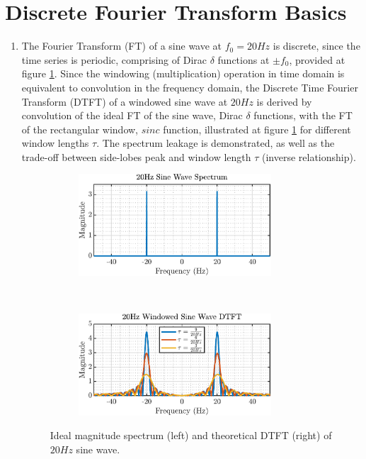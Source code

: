 \section{Discrete Fourier Transform Basics}

\begin{enumerate}[label=\alph*), leftmargin=*]
\item
%
The Fourier Transform (FT) of a sine wave at $f_{0}=20Hz$ is discrete, since the time series is periodic, comprising of Dirac $\delta$ functions at $\pm f_{0}$,
provided at figure \ref{fig:1_1_a}. Since the windowing (multiplication) operation in time domain is equivalent to convolution in the frequency domain,
the Discrete Time Fourier Transform (DTFT) of a windowed sine wave at $20Hz$ is derived by convolution of the ideal FT of the sine wave,
Dirac $\delta$ functions, with the FT of the rectangular window, $sinc$ function, illustrated at figure \ref{fig:1_1_a} for different window lengths $\tau$.
The spectrum leakage is demonstrated, as well as the trade-off between side-lobes peak and window length $\tau$ (inverse relationship).
%
\begin{figure}[h]
    \centering
    \begin{subfigure}{0.49\textwidth}
        \centering
        \includegraphics[height=1.5in]{report/spectrum-estimation/discete-fourier-transform-basics/assets/a/sine-ideal-spectrum}
    \end{subfigure}
    ~ 
    \begin{subfigure}{0.49\textwidth}
        \centering
        \includegraphics[height=1.5in]{report/spectrum-estimation/discete-fourier-transform-basics/assets/a/dtft-theoretical-window}
    \end{subfigure}
    \caption{Ideal magnitude spectrum (left) and theoretical DTFT (right) of $20Hz$ sine wave.}
    \label{fig:1_1_a}
\end{figure}



\end{enumerate}
